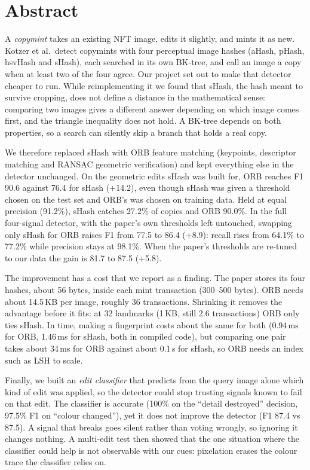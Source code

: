\section*{Abstract}

A \emph{copymint} takes an existing NFT image, edits it slightly, and mints it as new.
Kotzer et al.\ detect copymints with four perceptual image hashes (aHash, pHash, hsvHash
and sHash), each searched in its own BK-tree, and call an image a copy when at least two of
the four agree. Our project set out to make that detector cheaper to run. While
reimplementing it we found that sHash, the hash meant to survive cropping, does not define a
distance in the mathematical sense: comparing two images gives a different answer depending
on which image comes first, and the triangle inequality does not hold. A BK-tree depends on
both properties, so a search can silently skip a branch that holds a real copy.

We therefore replaced sHash with ORB feature matching (keypoints, descriptor matching and
RANSAC geometric verification) and kept everything else in the detector unchanged. On the
geometric edits sHash was built for, ORB reaches F1 90.6 against 76.4 for sHash (+14.2),
even though sHash was given a threshold chosen on the test set and ORB's was chosen on
training data. Held at equal precision (91.2\%), sHash catches 27.2\% of copies and ORB
90.0\%. In the full four-signal detector, with the paper's own thresholds left
untouched, swapping only sHash for ORB raises F1 from 77.5 to 86.4 (+8.9): recall rises
from 64.1\% to 77.2\% while precision stays at 98.1\%. When the paper's thresholds are
re-tuned to our data the gain is 81.7 to 87.5 (+5.8).

The improvement has a cost that we report as a finding. The paper stores its four hashes,
about 56 bytes, inside each mint transaction (300--500 bytes). ORB needs about 14.5\,KB per
image, roughly 36 transactions. Shrinking it removes the advantage before it fits: at 32
landmarks (1\,KB, still 2.6 transactions) ORB only ties sHash. In time, making a
fingerprint costs about the same for both (0.94\,ms for ORB, 1.46\,ms for sHash, both in
compiled code), but comparing one pair takes about 34\,ms for ORB against about
0.1\,\textmu s for sHash, so ORB needs an index such as LSH to scale.

Finally, we built an \emph{edit classifier} that predicts from the query image alone which
kind of edit was applied, so the detector could stop trusting signals known to fail on that
edit. The classifier is accurate (100\% on the ``detail destroyed'' decision, 97.5\% F1 on
``colour changed''), yet it does not improve the detector (F1 87.4 vs 87.5). A signal that
breaks goes silent rather than voting wrongly, so ignoring it changes nothing. A
multi-edit test then showed that the one situation where the classifier could help is not
observable with our cues: pixelation erases the colour trace the classifier relies on.
